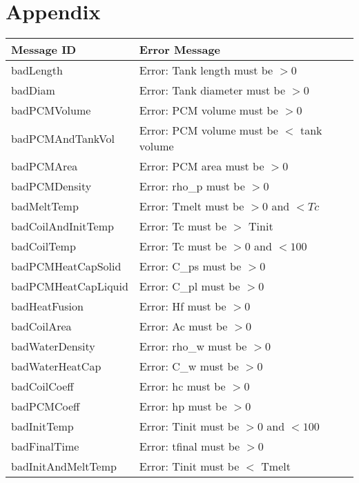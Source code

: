 \documentclass[12pt]{article}
\begin{document}
\section{Appendix} \label{Appendix}
\begin{center}
\begin{tabular}{l l}
\hline
\textbf{Message ID} & \textbf{Error Message} \\
\hline
badLength & Error: Tank length must be $> 0$ \\
badDiam & Error: Tank diameter must be $> 0$ \\
badPCMVolume & Error: PCM volume must be $> 0$ \\
badPCMAndTankVol & Error: PCM volume must be $<$ tank volume \\
badPCMArea & Error: PCM area must be $> 0$ \\
badPCMDensity & Error: rho\_p must be $> 0$ \\
badMeltTemp & Error: Tmelt must be $> 0$ and $< Tc$ \\
badCoilAndInitTemp & Error: Tc must be $>$ Tinit \\
badCoilTemp & Error: Tc must be $> 0$ and $< 100$ \\
badPCMHeatCapSolid & Error: C\_ps must be $> 0$ \\
badPCMHeatCapLiquid & Error: C\_pl must be $> 0$ \\
badHeatFusion & Error: Hf must be $> 0$ \\
badCoilArea & Error: Ac must be $> 0$ \\
badWaterDensity & Error: rho\_w must be $> 0$ \\
badWaterHeatCap & Error: C\_w must be $> 0$ \\
badCoilCoeff & Error: hc must be $> 0$ \\
badPCMCoeff & Error: hp must be $> 0$ \\
badInitTemp & Error: Tinit must be $> 0$ and $< 100$ \\
badFinalTime & Error: tfinal must be $> 0$ \\
badInitAndMeltTemp & Error: Tinit must be $<$ Tmelt \\
\hline
\end{tabular}
\end{center}
\end{document}
